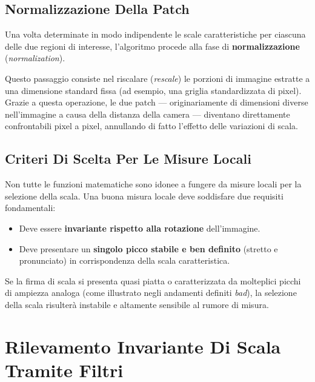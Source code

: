 ﻿\documentclass[11pt, a4paper]{article}
\begin{document}
\subsection{Normalizzazione Della Patch}

Una volta determinate in modo indipendente le scale caratteristiche per ciascuna delle due regioni di interesse, l'algoritmo procede alla fase di \textbf{normalizzazione} (\emph{normalization}).


Questo passaggio consiste nel riscalare (\emph{rescale}) le porzioni di immagine estratte a una dimensione standard fissa (ad esempio, una griglia standardizzata di pixel). Grazie a questa operazione, le due patch — originariamente di dimensioni diverse nell'immagine a causa della distanza della camera — diventano direttamente confrontabili pixel a pixel, annullando di fatto l'effetto delle variazioni di scala.

\subsection{Criteri Di Scelta Per Le Misure Locali}

Non tutte le funzioni matematiche sono idonee a fungere da misure locali per la selezione della scala. Una buona misura locale deve soddisfare due requisiti fondamentali:
\begin{itemize}
    \item Deve essere \textbf{invariante rispetto alla rotazione} dell'immagine.
    \item Deve presentare un \textbf{singolo picco stabile e ben definito} (stretto e pronunciato) in corrispondenza della scala caratteristica.
\end{itemize}


Se la firma di scala si presenta quasi piatta o caratterizzata da molteplici picchi di ampiezza analoga (come illustrato negli andamenti definiti \emph{bad}), la selezione della scala risulterà instabile e altamente sensibile al rumore di misura.

\newpage

\section{Rilevamento Invariante Di Scala Tramite Filtri}
\end{document}
